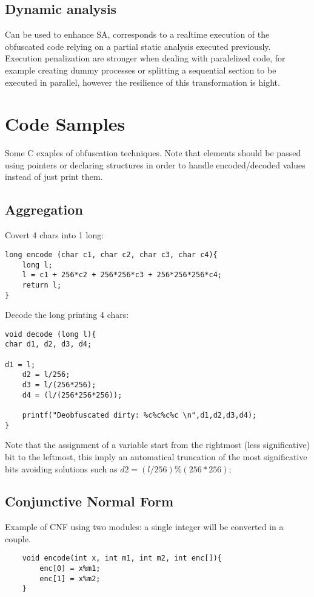 \subsection{Dynamic analysis}
Can be used to enhance SA, corresponds to a realtime execution of the obfuscated code relying on a partial static analysis executed previously.
Execution penalization are stronger when dealing with paralelized code, for example creating dummy processes or splitting a sequential section to be executed in parallel, however the resilience of this transformation is hight.

\section{Code Samples}
Some C exaples of obfuscation techniques. Note that elements should be passed using pointers or declaring structures in order to handle encoded/decoded values instead of just print them.
\subsection{Aggregation}
Covert 4 chars into 1 long:
\begin{lstlisting}
long encode (char c1, char c2, char c3, char c4){
	long l;
  	l = c1 + 256*c2 + 256*256*c3 + 256*256*256*c4;  
	return l;
}
\end{lstlisting}
Decode the long printing 4 chars:
\begin{lstlisting}
void decode (long l){
char d1, d2, d3, d4;

d1 = l;
 	d2 = l/256;
 	d3 = l/(256*256);
 	d4 = (l/(256*256*256));
 	
 	printf("Deobfuscated dirty: %c%c%c%c \n",d1,d2,d3,d4);
}
\end{lstlisting}
Note that the assignment of a variable start from the rightmost (less significative) bit to the leftmost, this imply an automatical truncation of the most significative bits avoiding solutions such as $d2 = (l/256)\%(256*256);$

\clearpage
\subsection{Conjunctive Normal Form}
Example of CNF using two modules: a single integer will be converted in a couple.
\begin{lstlisting}
	void encode(int x, int m1, int m2, int enc[]){
		enc[0] = x%m1;
		enc[1] = x%m2;
	}
\end{lstlisting}

